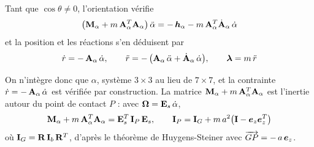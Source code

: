 \begin{corollaire}
    Tant que $\cos\theta \neq 0$, l'orientation vérifie
    \[
        \bigl(\mathbf{M}_\alpha + m\,\mathbf{A}_\alpha^T\mathbf{A}_\alpha\bigr)\,
        \ddot\alpha
        = -\,\bm{h}_\alpha
        - m\,\mathbf{A}_\alpha^T\dot{\mathbf{A}}_\alpha\,\dot\alpha
    \]
    et la position et les réactions s'en déduisent par
    \[
        \dot r = -\,\mathbf{A}_\alpha\,\dot\alpha,
        \qquad
        \ddot r = -\,\bigl(\mathbf{A}_\alpha\,\ddot\alpha
        + \dot{\mathbf{A}}_\alpha\,\dot\alpha\bigr),
        \qquad
        \bm{\lambda} = m\,\ddot r
    \]
\end{corollaire}

On n'intègre donc que $\alpha$, système $3\times3$ au lieu de $7\times7$,
et la contrainte $\dot r = -\,\mathbf{A}_\alpha\,\dot\alpha$ est vérifiée
par construction. La matrice
$\mathbf{M}_\alpha + m\,\mathbf{A}_\alpha^T\mathbf{A}_\alpha$ est l'inertie
autour du point de contact $P$ : avec $\bm{\Omega} = \mathbf{E}_s\,\dot\alpha$,
\[
    \mathbf{M}_\alpha + m\,\mathbf{A}_\alpha^T\mathbf{A}_\alpha
    = \mathbf{E}_s^T\,\mathbf{I}_P\,\mathbf{E}_s,
    \qquad
    \mathbf{I}_P = \mathbf{I}_G + m\,a^2\bigl(\mathbf{I} - \bm{e}_z\bm{e}_z^T\bigr)
\]
où $\mathbf{I}_G = \mathbf{R}\,\mathbf{I}_b\,\mathbf{R}^T$, d'après le théorème de
Huygens-Steiner avec $\overrightarrow{GP} = -\,a\,\bm{e}_z$.
